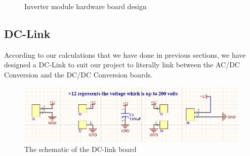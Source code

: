 \documentclass[12pt,a4paper]{book}
\begin{document}
\begin{figure}[ht!]
  \centering
  \hfill
  \caption{Inverter module hardware board design}
  \label{fig:image31}
\end{figure}

\subsection{DC-Link}
According to our calculations that we have done in previous sections, we have designed a DC-Link to suit our project to literally link between the AC/DC Conversion and the DC/DC Conversion boards.

\begin{figure}[ht]
  \centering
  \includegraphics[width = 17cm]{image44.png}
  \caption{The schematic of the DC-link board}
  \label{fig:image44}
\end{figure}
\end{document}
